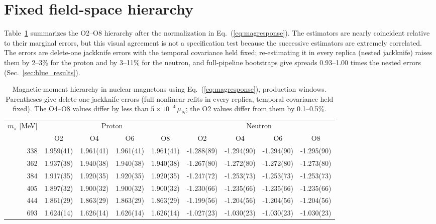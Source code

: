 \documentclass[aps,prd,preprint,nofootinbib,floatfix]{revtex4-2}
\begin{document}
\section{Fixed field-space hierarchy}
\label{sec:fixedresults}

Table~\ref{tab:highhierarchy} summarizes the O2--O8 hierarchy after the normalization in Eq.~(\ref{eq:magresponse}). The estimators are nearly coincident relative to their marginal errors, but this visual agreement is not a specification test because the successive estimators are extremely correlated. The errors are delete-one jackknife errors with the temporal covariance held fixed; re-estimating it in every replica (nested jackknife) raises them by 2--3\% for the proton and by 3--11\% for the neutron, and full-pipeline bootstraps give spreads 0.93--1.00 times the nested errors (Sec.~\ref{sec:blue_results}).

\begin{table}[t]
\caption{Magnetic-moment hierarchy in nuclear magnetons using Eq.~(\ref{eq:magresponse}), production windows. Parentheses give delete-one jackknife errors (full nonlinear refits in every replica, temporal covariance held fixed). The O4--O8 values differ by less than $5\times10^{-4}\,\mu_N$; the O2 values differ from them by 0.1--0.5\%.}
\label{tab:highhierarchy}
\centering
\begin{tabular}{rcccc@{\hspace{1.5em}}cccc}
\toprule
$m_\pi$ [MeV]&\multicolumn{4}{c}{Proton}&\multicolumn{4}{c}{Neutron}\\
\cmidrule(lr){2-5}\cmidrule(lr){6-9}
& O2 & O4 & O6 & O8 & O2 & O4 & O6 & O8\\
\midrule
338&1.959(41)&1.961(41)&1.961(41)&1.961(41)&-1.288(89)&-1.294(90)&-1.294(90)&-1.295(90)\\
362&1.937(38)&1.940(38)&1.940(38)&1.940(38)&-1.267(80)&-1.272(80)&-1.272(80)&-1.273(80)\\
384&1.917(35)&1.920(35)&1.920(35)&1.920(35)&-1.247(72)&-1.253(73)&-1.253(73)&-1.253(73)\\
405&1.897(32)&1.900(32)&1.900(32)&1.900(32)&-1.230(66)&-1.235(66)&-1.235(66)&-1.235(66)\\
444&1.861(29)&1.863(29)&1.863(29)&1.863(29)&-1.199(56)&-1.204(56)&-1.204(56)&-1.204(56)\\
693&1.624(14)&1.626(14)&1.626(14)&1.626(14)&-1.027(23)&-1.030(23)&-1.030(23)&-1.030(23)\\
\bottomrule
\end{tabular}
\end{table}
\end{document}
